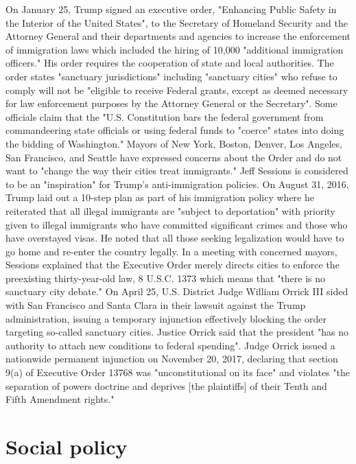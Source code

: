 On January 25, Trump signed an executive order, "Enhancing Public Safety
in the Interior of the United States", to the Secretary of Homeland
Security and the Attorney General and their departments and agencies to
increase the enforcement of immigration laws which included the hiring
of 10,000 "additional immigration officers." His order requires the
cooperation of state and local authorities. The order states "sanctuary
jurisdictions" including "sanctuary cities" who refuse to comply will
not be "eligible to receive Federal grants, except as deemed necessary
for law enforcement purposes by the Attorney General or the Secretary".
Some officials claim that the "U.S. Constitution bars the federal
government from commandeering state officials or using federal funds to
"coerce" states into doing the bidding of Washington." Mayors of New
York, Boston, Denver, Los Angeles, San Francisco, and Seattle have
expressed concerns about the Order and do not want to "change the way
their cities treat immigrants." Jeff Sessions is considered to be an
"inspiration" for Trump's anti-immigration policies. On August 31, 2016,
Trump laid out a 10-step plan as part of his immigration policy where he
reiterated that all illegal immigrants are "subject to deportation" with
priority given to illegal immigrants who have committed significant
crimes and those who have overstayed visas. He noted that all those
seeking legalization would have to go home and re-enter the country
legally. In a meeting with concerned mayors, Sessions explained that the
Executive Order merely directs cities to enforce the preexisting
thirty-year-old law, 8 U.S.C. 1373 which means that "there is no
sanctuary city debate." On April 25, U.S. District Judge William Orrick
III sided with San Francisco and Santa Clara in their lawsuit against
the Trump administration, issuing a temporary injunction effectively
blocking the order targeting so-called sanctuary cities. Justice Orrick
said that the president "has no authority to attach new conditions to
federal spending". Judge Orrick issued a nationwide permanent injunction
on November 20, 2017, declaring that section 9(a) of Executive Order
13768 was "unconstitutional on its face" and violates "the separation of
powers doctrine and deprives {[}the plaintiffs{]} of their Tenth and
Fifth Amendment rights."

\section{Social policy}\label{social-policy}

